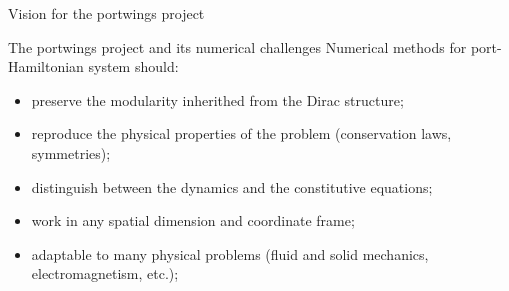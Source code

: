 \documentclass[aspectratio=169]{beamer}
\begin{document}
\begin{frame}{Vision for the portwings project}
	
\end{frame}

\begin{frame}{The portwings project and its numerical challenges}
	Numerical methods for port-Hamiltonian system should:
	\begin{itemize}
		\item preserve the modularity inherithed from the Dirac structure;
		\item reproduce the physical properties of the problem (conservation laws, symmetries);
		\item distinguish between the dynamics and the constitutive equations;
		\item work in any spatial dimension and coordinate frame;
		\item adaptable to many physical problems (fluid and solid mechanics, electromagnetism, etc.);
	\end{itemize}
\end{frame}
\end{document}

